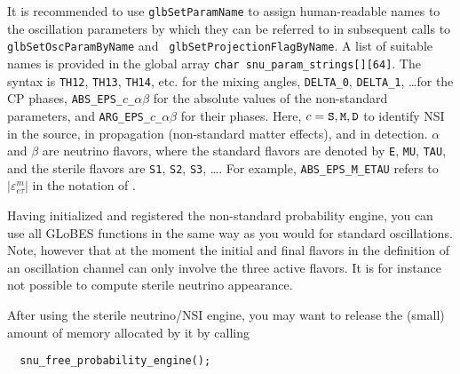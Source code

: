 \documentclass{article}
\begin{document}
It is recommended to use {\tt glbSetParamName} to assign human-readable
names to the oscillation parameters by which they can be referred to in
subsequent calls to {\tt glbSetOscParamByName} and {\tt
glbSetProjectionFlagByName}. A list of suitable names is provided in the global
array {\tt char snu\_param\_strings[][64]}. The syntax is {\tt TH12},
{\tt TH13}, {\tt TH14}, etc. for the mixing angles, {\tt DELTA\_0},
{\tt DELTA\_1}, \dots for the CP phases, {\tt ABS\_EPS\_$c$\_$\alpha\beta$}
for the absolute values of the non-standard parameters, and
{\tt ARG\_EPS\_$c$\_$\alpha\beta$} for their phases. Here, $c = {\tt S},
{\tt M}, {\tt D}$ to identify NSI in the source, in propagation (non-standard
matter effects), and in detection. $\alpha$ and $\beta$ are neutrino flavors,
where the standard flavors are denoted by {\tt E}, {\tt MU}, {\tt TAU},
and the sterile flavors are {\tt S1}, {\tt S2}, {\tt S3}, \dots. For
example, {\tt ABS\_EPS\_M\_ETAU} refers to $|\varepsilon^m_{e\tau}|$
in the notation of \cite{Kopp:2007ne}.

Having initialized and registered the non-standard probability engine, you can
use all GLoBES functions in the same way as you would for standard
oscillations.  Note, however that at the moment the initial and final flavors
in the definition of an oscillation channel can only involve the three active
flavors. It is for instance not possible to compute sterile neutrino
appearance.

After using the sterile neutrino/NSI engine, you may want to release the
(small) amount of memory allocated by it by calling
\begin{verbatim}
  snu_free_probability_engine();
\end{verbatim}



\end{document}

